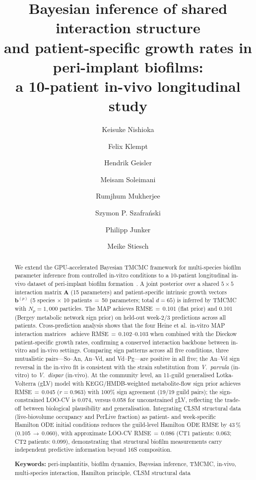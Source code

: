 \documentclass[11pt,a4paper]{article}
\title{Bayesian inference of shared interaction structure\\
and patient-specific growth rates in peri-implant biofilms:\\
a 10-patient in-vivo longitudinal study}
\author[1]{Keisuke Nishioka}
\author[1]{Felix Klempt}
\author[1]{Hendrik Geisler}
\author[1]{Meisam Soleimani}
\author[2,3]{Rumjhum Mukherjee}
\author[2,3]{Szymon P. Szafra\'{n}ski}
\author[1]{Philipp Junker}
\author[2,3]{Meike Stiesch}
\affil[1]{Institute of Continuum Mechanics, Leibniz Universit\"at Hannover, Hannover, Germany}
\affil[2]{Department of Prosthetic Dentistry and Biomedical Materials Science, Hannover Medical School, Hannover, Germany}
\affil[3]{Lower Saxony Centre for Biomedical Engineering, Implant Research and Development (NIFE), Hannover, Germany}
\date{}
\newcommand{\bA}{\mathbf{A}}
\newcommand{\bb}{\mathbf{b}}
\begin{document}
\maketitle

\begin{abstract}
We extend the GPU-accelerated Bayesian TMCMC framework for multi-species biofilm parameter inference from controlled in-vitro conditions to a 10-patient longitudinal in-vivo dataset of peri-implant biofilm formation~\cite{Dieckow2025InVivo}.
A joint posterior over a shared $5\times5$ interaction matrix $\bA$ (15 parameters) and patient-specific intrinsic growth vectors $\bb^{(p)}$ (5 species $\times$ 10 patients\,$=\,$50 parameters; total $d\!=\!65$) is inferred by TMCMC with $N_p\!=\!1{,}000$ particles.
The MAP achieves RMSE\,$=\,$0.101 (flat prior) and 0.101 (Bergey metabolic network sign prior) on held-out week-2/3 predictions across all patients.
Cross-prediction analysis shows that the four Heine et al.\ in-vitro MAP interaction matrices~\cite{Heine2025PeriImplant} achieve RMSE\,$=\,$0.102--0.103 when combined with the Dieckow patient-specific growth rates, confirming a conserved interaction backbone between in-vitro and in-vivo settings.
Comparing sign patterns across all five conditions, three mutualistic pairs---So--An, An--Vd, and Vd--Pg---are positive in all five; the An--Vd sign reversal in the in-vivo fit is consistent with the strain substitution from \textit{V.~parvula} (in-vitro) to \textit{V.~dispar} (in-vivo).
At the community level, an 11-guild generalised Lotka-Volterra (gLV) model with KEGG/HMDB-weighted metabolite-flow sign prior achieves RMSE\,$=\,$0.045 ($r=0.963$) with 100\% sign agreement (19/19 guild pairs); the sign-constrained LOO-CV is 0.074, versus 0.058 for unconstrained gLV, reflecting the trade-off between biological plausibility and generalisation.
Integrating CLSM structural data (live-biovolume occupancy and PerLive fraction) as patient- and week-specific Hamilton ODE initial conditions reduces the guild-level Hamilton ODE RMSE by 43\,\% (0.105\,$\to$\,0.060), with approximate LOO-CV RMSE\,$=\,$0.086 (CT1 patients: 0.063; CT2 patients: 0.099), demonstrating that structural biofilm measurements carry independent predictive information beyond 16S composition.

\vspace{4pt}
\noindent\textbf{Keywords:}
peri-implantitis,
biofilm dynamics,
Bayesian inference,
TMCMC,
in-vivo,
multi-species interaction,
Hamilton principle,
CLSM structural data
\end{abstract}
\end{document}
